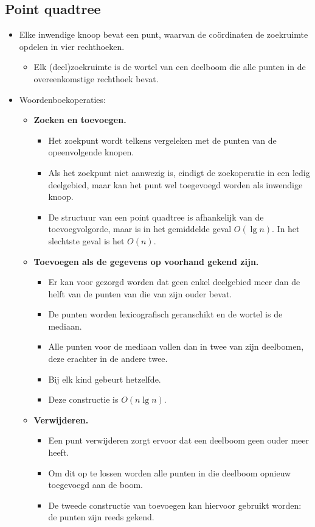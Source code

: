 \subsection{Point quadtree}
\begin{itemize}
    \item Elke inwendige knoop bevat een punt, waarvan de coördinaten de zoekruimte opdelen in vier rechthoeken.
    \begin{itemize}
        \item Elk (deel)zoekruimte is de wortel van een deelboom die alle punten in de overeenkomstige rechthoek bevat.
    \end{itemize}
    \item Woordenboekoperaties:
    \begin{itemize}
        \item \textbf{Zoeken en toevoegen.}
        \begin{itemize}
            \item Het zoekpunt wordt telkens vergeleken met de punten van de opeenvolgende knopen.
            \item Als het zoekpunt niet aanwezig is, eindigt de zoekoperatie in een ledig deelgebied, maar kan het punt wel toegevoegd worden als inwendige knoop.
            \item De structuur van een point quadtree is afhankelijk van de toevoegvolgorde, maar is in het gemiddelde geval $O(\lg n)$. In het slechtste geval is het $O(n)$.
        \end{itemize}
        \item \textbf{Toevoegen als de gegevens op voorhand gekend zijn.}
        \begin{itemize}
            \item Er kan voor gezorgd worden dat geen enkel deelgebied meer dan de helft van de punten van die van zijn ouder bevat.
            \item De punten worden lexicografisch geranschikt en de wortel is de mediaan.
            \item Alle punten voor de mediaan vallen dan in twee van zijn deelbomen, deze erachter in de andere twee. 
            \item Bij elk kind gebeurt hetzelfde.
            \item Deze constructie is $O(n\lg n)$. 
        \end{itemize}
        \item \textbf{Verwijderen.}
        \begin{itemize}
            \item Een punt verwijderen zorgt ervoor dat een deelboom geen ouder meer heeft.
            \item Om dit op te lossen worden alle punten in die deelboom opnieuw toegevoegd aan de boom.
            \item De tweede constructie van toevoegen kan hiervoor gebruikt worden: de punten zijn reeds gekend.
        \end{itemize}

    \end{itemize}
\end{itemize}


